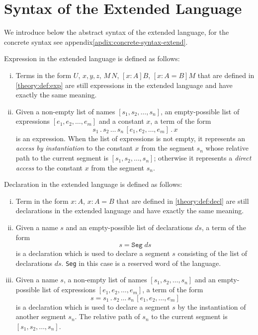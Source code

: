 \section{Syntax of the Extended Language}
We introduce below the abstract syntax of the extended language, for the concrete syntax see appendix\ref{apdix:concrete-syntax-extend}.

Expression in the extended language is defined as follows:
\begin{definition}[Expression]
  \leavevmode \vspace{-\baselineskip}
  \begin{enumerate}[(i)]
  \item Terms in the form $U$, $x,y,z$, $M\,N$, $[x:A]B$, $[x:A=B] M$ that are defined in \ref{theory:def:exp} are still expressions in the extended language and have exactly the same meaning.
  \item Given a non-empty list of names $[s_1,s_2,\dots,s_n]$, an empty-possible list of expressions $[e_1,e_2,\dots,e_m]$ and a constant $x$, a term of the form
    \[ s_1\,.\,s_2\,\dots\,s_n\,[e_1,e_2,\dots,e_m]\,.\,x \]
    is an expression. When the list of expressions is not empty, it represents an \emph{access by instantiation} to the constant $x$ from the segment $s_n$ whose relative path to the current segment is $[s_1,s_2,\dots,s_n]$; otherwise it represents a \emph{direct access} to the constant $x$ from the segment $s_n$.
  \end{enumerate}
\end{definition}

Declaration in the extended language is defined as follows:
\begin{definition}[Declaration]
  \leavevmode \vspace{-\baselineskip}
  \begin{enumerate}[(i)]
  \item Term in the form $x : A$, $x : A = B$ that are defined in \ref{theory:def:decl} are still declarations in the extended language and have exactly the same meaning.
  \item Given a name $s$ and an empty-possible list of declarations $ds$, a term of the form
    \[ s = \texttt{Seg}\;ds \]
    is a declaration which is used to declare a segment $s$ consisting of the list of declarations $ds$. \texttt{Seg} in this case is a reserved word of the language.
  \item Given a name $s$, a non-empty list of names $[s_1,s_2,\dots,s_n]$ and an empty-possible list of expressions $[e_1,e_2,\dots,e_m]$, a term of the form
    \[ s = s_1\,.\,s_2\,\dots\,s_n\,[e_1,e_2,\dots,e_m] \]
    is a declaration which is used to declare a segment $s$ by the instantiation of another segment $s_n$. The relative path of $s_n$ to the current segment is $[s_1,s_2,\dots,s_n]$.
  \end{enumerate}
\end{definition}

